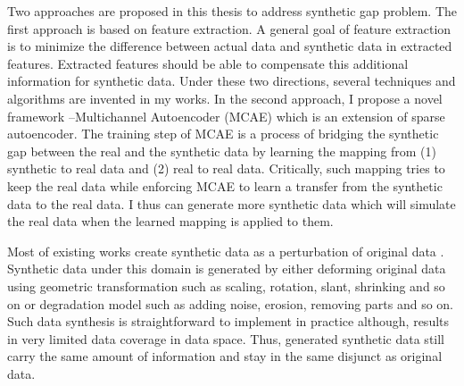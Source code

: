 \documentclass{iitthesis}
\begin{document}
Two approaches are proposed in this thesis to address synthetic gap problem. The first approach is based on feature extraction. A general goal of feature extraction is to minimize the difference between actual data and synthetic data in extracted features. Extracted features should be able to compensate this additional information for synthetic data. Under these two directions, several techniques and algorithms are invented in my works. In the second approach, I propose a novel framework --Multichannel Autoencoder (MCAE) which is an extension of sparse autoencoder. The training step of MCAE is a process of bridging the synthetic gap between the real and the synthetic data by learning the mapping from (1) synthetic to real data and (2) real to real data. Critically, such mapping tries to keep the real data while enforcing MCAE to learn a transfer from the synthetic data to the real data. I thus can generate more synthetic data which will simulate the real data when the learned mapping is applied to them.


Most of existing works create synthetic data as a perturbation of original data \cite{Comput.Sci.&Appl.Math.1997}\cite{Ulanova2014}\cite{2012}\cite{VT:03}\cite{VT:04}\cite{NJ:09}. Synthetic data under this domain is generated by either deforming original data using geometric transformation such as scaling, rotation, slant, shrinking and so on or degradation model such as adding noise, erosion, removing parts and so on. Such data synthesis is straightforward to implement in practice although, results in very limited data coverage in data space. Thus, generated synthetic data still carry the same amount of information and stay in the same disjunct as original data. 
\end{document}
